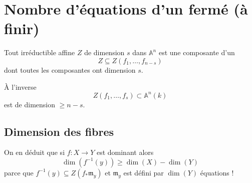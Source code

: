 \documentclass[a4paper,12pt]{book}
\newcommand{\A}{\mathbb{A}}
\newcommand{\m}{\mathfrak{m}}
\theoremstyle{plain}
\theoremstyle{definition}
\theoremstyle{remark}
\begin{document}
\section{Nombre d'équations d'un fermé (à finir)}
Tout irréductible affine $Z$ de dimension $s$ dans $\A^n$ est une 
composante d'un
\[Z\subseteq Z(f_1,\ldots, f_{n-s})\]
dont toutes les composantes ont dimension $s$. 

À l'inverse
\[Z(f_1,\ldots, f_{s})\subset \A^n(k)\]
est de dimension $\geq n-s$.
\subsection{Dimension des fibres}
On en déduit que si $f\colon X\to Y$ est dominant alors
\[\dim(f^{-1}(y))\geq \dim(X)-\dim(Y)\]
parce que $f^{-1}(y)\subseteq Z(f_*\m_y)$ et $\m_y$ est défini
par $\dim(Y)$ équations !

\printbibliography
\end{document}
